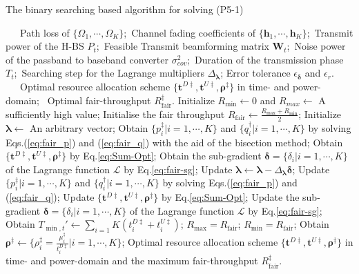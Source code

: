 \documentclass[12pt,draftcls,onecolumn,journal]{IEEEtran}
\begin{document}
\begin{algorithm}[!t]
	\caption{The binary searching based algorithm for solving (P5-1)}
	\footnotesize
	\begin{algorithmic}[1]
		\REQUIRE ~~\
		Path loss of $\{\Omega_1,\cdots,\Omega_K\}$;\
		Channel fading coefficients of $\{\mathbf{h}_1,\cdots,\mathbf{h}_K\}$;\
		Transmit power of the H-BS $P_{t}$;\
		Feasible Transmit beamforming matrix $\mathbf{W}_t$;\
		Noise power of the passband to baseband converter $\sigma^2_{cov}$;\
		Duration of the transmission phase $T_t$;\
		Searching step for the Lagrange multipliers $\Delta_{\boldsymbol{\lambda}}$;
		Error tolerance $\epsilon_{\boldsymbol{\delta}}$ and $\epsilon_{r}$.
		\ENSURE ~~\
		Optimal resource allocation scheme $\{\mathbf{t}^{D\ddagger}, \mathbf{t}^{U\ddagger}, \boldsymbol{\rho}^{\ddagger}\}$ in time- and power-domain; \
		Optimal fair-throughput $R_{\text{fair}}^{\ddagger}$.
		\STATE Initialize $R_{\min} \leftarrow 0$ and $R_{max} \leftarrow$ A sufficiently high value;
		\WHILE{$R_{max}-R_{min} > \epsilon_r$}
			\STATE Initialise the fair throughput $R_{\text{fair}} \leftarrow \frac{R_{\max} + R_{\min}}{2}$;
			\STATE Initialize $\boldsymbol{\lambda}\leftarrow$ An arbitrary vector;
			\STATE Obtain $\{p_i^{\ddagger} | i =1,\cdots,K\}$ and $\{q_i^{\dagger}| i=1,\cdots,K\}$ by solving Eqs.(\ref{eq:fair_p}) and (\ref{eq:fair_q}) with the aid of the bisection method;
			\STATE Obtain $\{\mathbf{t}^{D\ddagger}, \mathbf{t}^{U\ddagger}, \boldsymbol{\rho}^{\ddagger}\}$ by Eq.\eqref{eq:Sum-Opt};
			\STATE Obtain the sub-gradient $\boldsymbol{\delta} = \{\delta_i| i=1,\cdots,K\}$ of the Lagrange function $\mathcal{L}$ by Eq.\eqref{eq:fair-sg};
			\WHILE{$|\boldsymbol{\delta}| > \epsilon_{\boldsymbol{\delta}}$}
				\STATE Update $\boldsymbol{\lambda} \leftarrow \boldsymbol{\lambda} - \Delta_{\boldsymbol{\lambda}} \boldsymbol{\delta}$;
				\STATE Update $\{p_i^{\ddagger} | i =1,\cdots,K\}$ and $\{q_i^{\dagger}| i=1,\cdots,K\}$ by solving Eqs.(\ref{eq:fair_p}) and (\ref{eq:fair_q});
				\STATE Update $\{\mathbf{t}^{D\ddagger}, \mathbf{t}^{U\ddagger}, \boldsymbol{\rho}^{\ddagger}\}$ by Eq.\eqref{eq:Sum-Opt};
				\STATE Update the sub-gradient $\boldsymbol{\delta} = \{\delta_i| i=1,\cdots,K\}$ of the Lagrange function $\mathcal{L}$ by Eq.\eqref{eq:fair-sg};
			\ENDWHILE
			\STATE Obtain $T_{\min,t}' \leftarrow \sum_{i=1}{K}(t_i^{D\ddagger} + t_i^{U\ddagger})$;
			\IF{$T_{\min,t}' \leq T_{tra}$}
				\STATE $R_{\max} = R_{\text{fair}}$;
			\ELSE
				\STATE $R_{\min} = R_{\text{fair}}$;
			\ENDIF	
		\ENDWHILE
		\STATE Obtain $\boldsymbol{\rho}^{\ddagger} \leftarrow \{\rho_i^{\ddagger} = \frac{\mu_i^{\ddagger}}{t_i^{D\ddagger}} | i=1,\cdots, K\}$;
		\RETURN Optimal resource allocation scheme $\{\mathbf{t}^{D\ddagger}, \mathbf{t}^{U\ddagger}, \boldsymbol{\rho}^{\ddagger}\}$ in time- and power-domain and the maximum fair-throughput $R_{\text{fair}}^{\ddagger}$.
	\end{algorithmic}
\end{algorithm}
\end{document}
